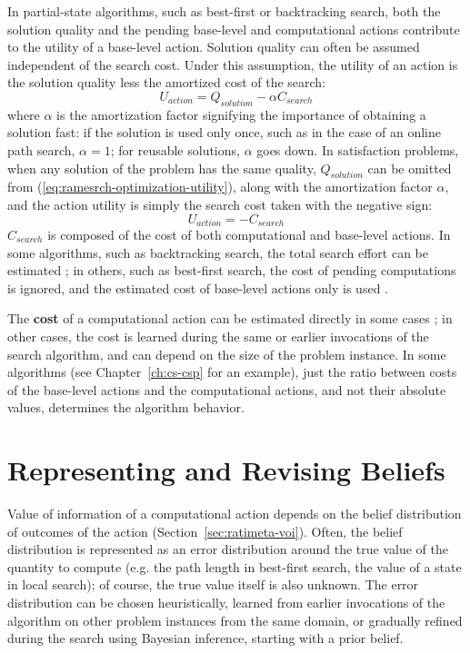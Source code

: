 In partial-state algorithms, such as best-first or backtracking
search, both the solution quality and the pending base-level and
computational actions contribute to the utility of a base-level
action. Solution quality can often be assumed independent of the
search cost. Under this assumption, the utility of an action is the solution quality
less the amortized cost of the search:
\begin{equation}
\label{eq:ramesrch-optimization-utility}
U_{action}=Q_{solution}-\alpha C_{search}
\end{equation} where $\alpha$ is the amortization factor signifying the
importance of obtaining a solution fast: if the solution is used only
once, such as in the case of an online path search, $\alpha=1$; for
reusable solutions, $\alpha$ goes down. In satisfaction problems, when
any solution of the problem has the same quality, $Q_{solution}$
can be omitted from (\ref{eq:ramesrch-optimization-utility}), along
with the amortization factor $\alpha$, and the action utility is
simply the search cost taken with the negative sign:
\begin{equation}
\label{eq:ramesrch-satisfaction-utility} U_{action}=-C_{search}
\end{equation} $C_{search}$ is composed of the cost of both
computational and base-level actions. In some algorithms, such as
backtracking search, the total search effort can be estimated
\cite{Knuth.backtrack}\cite{Refalo.impact}; in others, such as
best-first search, the cost of pending computations is ignored, and
the estimated cost of base-level actions only is used
\cite{Russell.right}.

The {\bf cost} of a computational action can be estimated directly in
some cases \cite{Russell.right}; in other cases, the cost is learned
during the same or earlier invocations of the search algorithm, and
can depend on the size of the problem instance. In some algorithms
(see Chapter~\ref{ch:cs-csp} for an example), just the ratio between
costs of the base-level actions and the computational actions, and not
their absolute values, determines the algorithm behavior.

\section{Representing and Revising Beliefs}

Value of information of a computational action depends on the belief
distribution of outcomes of the action
(Section~\ref{sec:ratimeta-voi}).  Often, the belief distribution is
represented as an error distribution around the true value of the
quantity to compute (e.g. the path length in best-first search, the
value of a state in local search); of course, the true value itself is
also unknown.  The error distribution can be chosen heuristically,
learned from earlier invocations of the algorithm on other problem
instances from the same domain, or gradually refined during the search
using Bayesian inference, starting with a prior belief.

